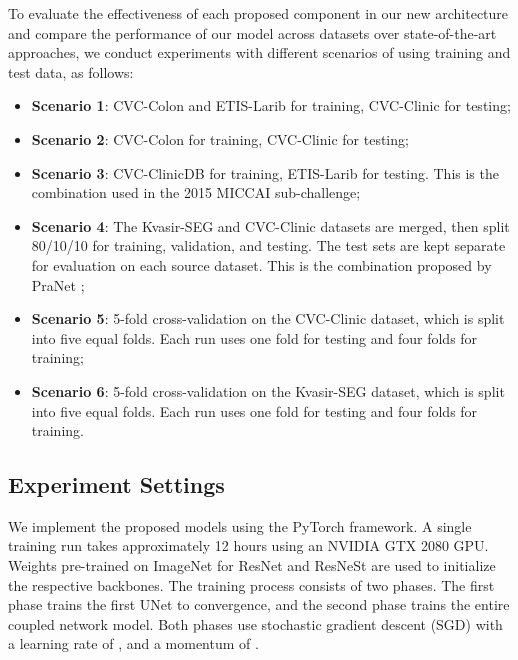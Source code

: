 \documentclass[review, sort&compress]{elsarticle}
\begin{document}
To evaluate the effectiveness of each proposed component in our new architecture and compare the performance of our model across datasets over state-of-the-art approaches, we conduct experiments with different scenarios of using training and test data, as follows:
\begin{itemize}
\item \textbf{Scenario 1}: CVC-Colon and ETIS-Larib for training, CVC-Clinic for testing;
\item \textbf{Scenario 2}: CVC-Colon for training, CVC-Clinic for testing;
\item \textbf{Scenario 3}: CVC-ClinicDB for training, ETIS-Larib for testing. This is the combination used in the 2015 MICCAI sub-challenge;
\item \textbf{Scenario 4}: The Kvasir-SEG and CVC-Clinic datasets are merged, then split 80/10/10 for training, validation, and testing. The test sets are kept separate for evaluation on each source dataset. This is the combination proposed by PraNet \cite{fan2020pranet};
\item \textbf{Scenario 5}: 5-fold cross-validation on the CVC-Clinic dataset, which is split into five equal folds. Each run uses one fold for testing and four folds for training;
\item \textbf{Scenario 6}: 5-fold cross-validation on the Kvasir-SEG dataset, which is split into five equal folds. Each run uses one fold for testing and four folds for training.
\end{itemize}

\subsection{Experiment Settings}
We implement the proposed models using the PyTorch framework. A single training run takes approximately 12 hours using an NVIDIA GTX 2080 GPU. Weights pre-trained on ImageNet for ResNet and ResNeSt are used to initialize the respective backbones. The training process consists of two phases. The first phase trains the first UNet to convergence, and the second phase trains the entire coupled network model. Both phases use stochastic gradient descent (SGD) with a learning rate of , and a momentum of . 
\end{document}
